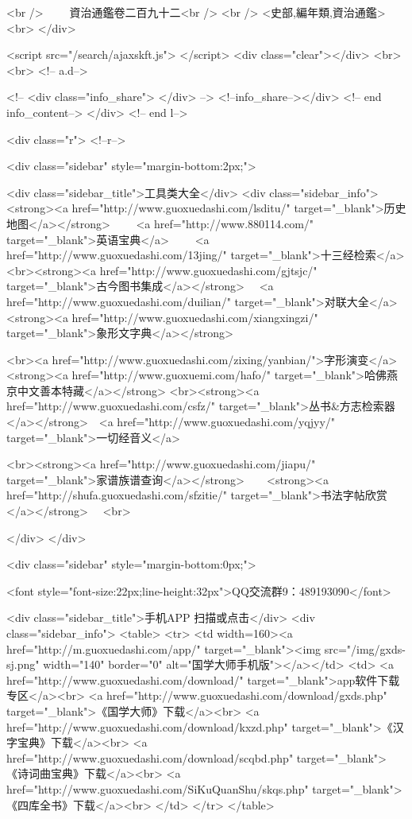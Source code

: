 <br />
　　資治通鑑卷二百九十二<br />
<br />
<史部,編年類,資治通鑑>  <br>
   </div> 

<script src="/search/ajaxskft.js"> </script>
 <div class="clear"></div>
<br>
<br>
 <!-- a.d-->

 <!--
<div class="info_share">
</div> 
-->
 <!--info_share--></div>   <!-- end info_content-->
  </div> <!-- end l-->

<div class="r">   <!--r-->



<div class="sidebar"  style="margin-bottom:2px;">

 
<div class="sidebar_title">工具类大全</div>
<div class="sidebar_info">
<strong><a href="http://www.guoxuedashi.com/lsditu/" target="_blank">历史地图</a></strong>　　
<a href="http://www.880114.com/" target="_blank">英语宝典</a>　　
<a href="http://www.guoxuedashi.com/13jing/" target="_blank">十三经检索</a>　
<br><strong><a href="http://www.guoxuedashi.com/gjtsjc/" target="_blank">古今图书集成</a></strong>　
<a href="http://www.guoxuedashi.com/duilian/" target="_blank">对联大全</a>　<strong><a href="http://www.guoxuedashi.com/xiangxingzi/" target="_blank">象形文字典</a></strong>　

<br><a href="http://www.guoxuedashi.com/zixing/yanbian/">字形演变</a>　　<strong><a href="http://www.guoxuemi.com/hafo/" target="_blank">哈佛燕京中文善本特藏</a></strong>
<br><strong><a href="http://www.guoxuedashi.com/csfz/" target="_blank">丛书&方志检索器</a></strong>　<a href="http://www.guoxuedashi.com/yqjyy/" target="_blank">一切经音义</a>　　

<br><strong><a href="http://www.guoxuedashi.com/jiapu/" target="_blank">家谱族谱查询</a></strong>　　<strong><a href="http://shufa.guoxuedashi.com/sfzitie/" target="_blank">书法字帖欣赏</a></strong>　
<br>

</div>
</div>


<div class="sidebar" style="margin-bottom:0px;">

<font style="font-size:22px;line-height:32px">QQ交流群9：489193090</font>


<div class="sidebar_title">手机APP 扫描或点击</div>
<div class="sidebar_info">
<table>
<tr>
	<td width=160><a href="http://m.guoxuedashi.com/app/" target="_blank"><img src="/img/gxds-sj.png" width="140"  border="0" alt="国学大师手机版"></a></td>
	<td>
<a href="http://www.guoxuedashi.com/download/" target="_blank">app软件下载专区</a><br>
<a href="http://www.guoxuedashi.com/download/gxds.php" target="_blank">《国学大师》下载</a><br>
<a href="http://www.guoxuedashi.com/download/kxzd.php" target="_blank">《汉字宝典》下载</a><br>
<a href="http://www.guoxuedashi.com/download/scqbd.php" target="_blank">《诗词曲宝典》下载</a><br>
<a href="http://www.guoxuedashi.com/SiKuQuanShu/skqs.php" target="_blank">《四库全书》下载</a><br>
</td>
</tr>
</table>

